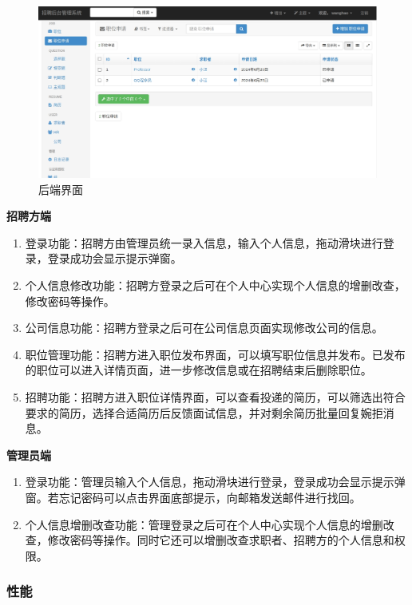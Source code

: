 \documentclass[UTF8,a4paper,10pt]{ctexart}
\begin{document}
\begin{figure}[H]
    \centering
    \includegraphics[width=\textwidth]{img/后端界面.png}
    \caption{后端界面}
    \label{fig:后端界面}
\end{figure}

\textbf{招聘方端}
\begin{enumerate}
    \item 登录功能：招聘方由管理员统一录入信息，输入个人信息，拖动滑块进行登录，登录成功会显示提示弹窗。
    \item 个人信息修改功能：招聘方登录之后可在个人中心实现个人信息的增删改查，修改密码等操作。
    \item 公司信息功能：招聘方登录之后可在公司信息页面实现修改公司的信息。
    \item 职位管理功能：招聘方进入职位发布界面，可以填写职位信息并发布。已发布的职位可以进入详情页面，进一步修改信息或在招聘结束后删除职位。
    \item 招聘功能：招聘方进入职位详情界面，可以查看投递的简历，可以筛选出符合要求的简历，选择合适简历后反馈面试信息，并对剩余简历批量回复婉拒消息。    
\end{enumerate}

\textbf{管理员端}
\begin{enumerate}
    \item 登录功能：管理员输入个人信息，拖动滑块进行登录，登录成功会显示提示弹窗。若忘记密码可以点击界面底部提示，向邮箱发送邮件进行找回。
    \item 个人信息增删改查功能：管理登录之后可在个人中心实现个人信息的增删改查，修改密码等操作。同时它还可以增删改查求职者、招聘方的个人信息和权限。
\end{enumerate}

\subsubsection{性能}
\end{document}
